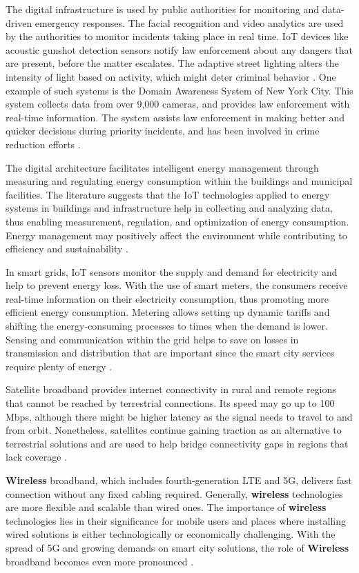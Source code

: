 \documentclass[pdflatex,sn-mathphys-num]{sn-jnl}%
\theoremstyle{thmstyleone}%
\theoremstyle{thmstyletwo}%
\theoremstyle{thmstylethree}%
\begin{document}
The digital infrastructure is used by public authorities for monitoring and data-driven emergency responses. The facial recognition and video analytics are used by the authorities to monitor incidents taking place in real time. IoT devices like acoustic gunshot detection sensors notify law enforcement about any dangers that are present, before the matter escalates. The adaptive street lighting alters the intensity of light based on activity, which might deter criminal behavior \cite{r13,r17}. One example of such systems is the Domain Awareness System of New York City. This system collects data from over 9,000 cameras, and provides law enforcement with real-time information. The system assists law enforcement in making better and quicker decisions during priority incidents, and has been involved in crime reduction efforts \cite{r14,r18}.

The digital architecture facilitates intelligent energy management through measuring and regulating energy consumption within the buildings and municipal facilities. The literature suggests that the IoT technologies applied to energy systems in buildings and infrastructure help in collecting and analyzing data, thus enabling measurement, regulation, and optimization of energy consumption. Energy management may positively affect the environment while contributing to efficiency and sustainability \cite{r108,r19}.

In smart grids, IoT sensors monitor the supply and demand for electricity and help to prevent energy loss. With the use of smart meters, the consumers receive real-time information on their electricity consumption, thus promoting more efficient energy consumption. Metering allows setting up dynamic tariffs and shifting the energy-consuming processes to times when the demand is lower. Sensing and communication within the grid helps to save on losses in transmission and distribution that are important since the smart city services require plenty of energy \cite{r98}.

Satellite broadband provides internet connectivity in rural and remote regions that cannot be reached by terrestrial connections. Its speed may go up to 100 Mbps, although there might be higher latency as the signal needs to travel to and from orbit. Nonetheless, satellites continue gaining traction as an alternative to terrestrial solutions and are used to help bridge connectivity gaps in regions that lack coverage \cite{r20,r21}.

\textbf{Wireless} broadband, which includes fourth-generation LTE and 5G, delivers fast connection without any fixed cabling required. Generally, \textbf{wireless} technologies are more flexible and scalable than wired ones. The importance of \textbf{wireless} technologies lies in their significance for mobile users and places where installing wired solutions is either technologically or economically challenging. With the spread of 5G and growing demands on smart city solutions, the role of \textbf{Wireless} broadband becomes even more pronounced \cite{r22}.
\end{document}
